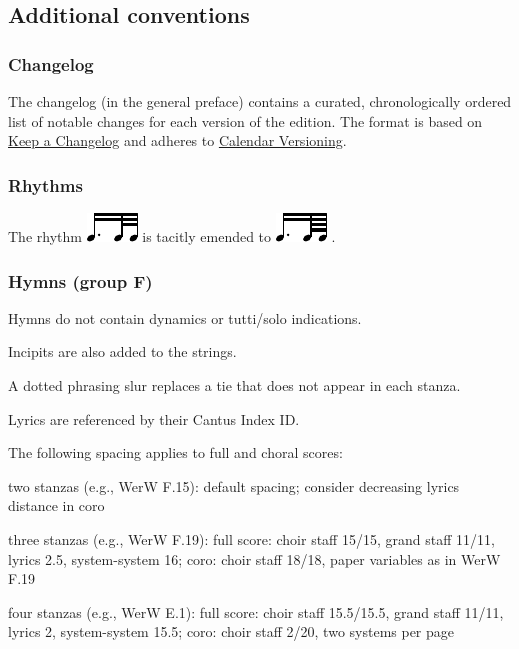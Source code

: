 \documentclass{ees}
\begin{document}
\subsection{Additional conventions}

\subsubsection{Changelog}

The changelog (in the general preface) contains a curated, chronologically ordered list of notable changes for each version of the edition. The format is based on \href{https://keepachangelog.com/en/1.0.0/}{Keep a Changelog} and adheres to \href{https://calver.org}{Calendar Versioning}.

\subsubsection{Rhythms}

The rhythm \includegraphics[scale=.75]{rhythm_16d_32_32} is tacitly emended to \includegraphics[scale=.75]{rhythm_16d_64_64} .

\subsubsection{Hymns (group F)}

Hymns do not contain dynamics or tutti/solo indications.

Incipits are also added to the strings.

A dotted phrasing slur replaces a tie that does not appear in each stanza.

Lyrics are referenced by their Cantus Index ID.

The following spacing applies to full and choral scores:
\begin{bulletlist}
  \item two stanzas (e.g., WerW F.15):
    default spacing;
    consider decreasing lyrics distance in coro
  \item three stanzas (e.g., WerW F.19):
    full score:
      choir staff 15/15,
      grand staff 11/11,
      lyrics 2.5,
      system-system 16;
    coro:
      choir staff 18/18,
      paper variables as in WerW F.19
  \item four stanzas (e.g., WerW E.1):
    full score:
      choir staff 15.5/15.5,
      grand staff 11/11,
      lyrics 2,
      system-system 15.5;
    coro:
      choir staff 2/20,
      two systems per page
\end{bulletlist}
\end{document}
